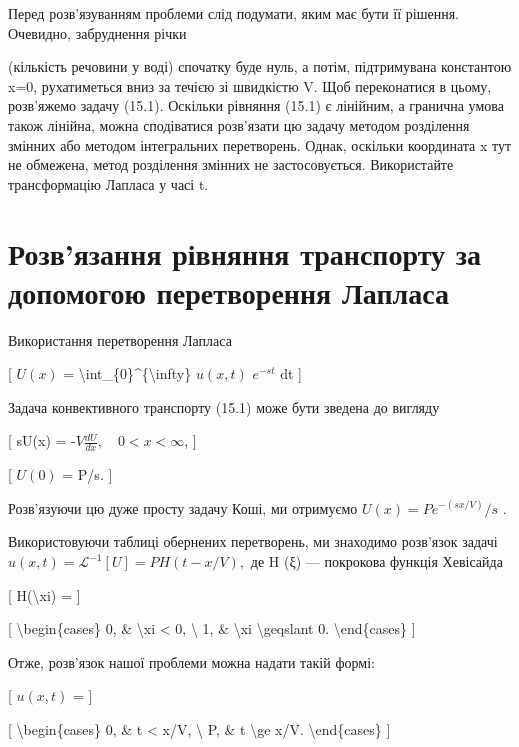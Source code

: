 \documentclass[
]{article}
\begin{document}
{{Перед розв'язуванням проблеми слід подумати, яким має бути її рішення.
Очевидно, забруднення річки

(кількість речовини у воді) спочатку буде нуль, а потім, підтримувана
константою x=0, рухатиметься вниз за течією зі швидкістю V. Щоб
переконатися в цьому, розв'яжемо задачу (15.1). Оскільки рівняння (15.1)
є лінійним, а гранична умова також лінійна, можна сподіватися розв'язати
цю задачу методом розділення змінних або методом інтегральних
перетворень. Однак, оскільки координата x тут не обмежена, метод
розділення змінних не застосовується. Використайте трансформацію Лапласа
у часі t.

\section{Розв'язання рівняння транспорту за допомогою перетворення
Лапласа}\label{ux440ux43eux437ux432ux44fux437ux430ux43dux43dux44f-ux440ux456ux432ux43dux44fux43dux43dux44f-ux442ux440ux430ux43dux441ux43fux43eux440ux442ux443-ux437ux430-ux434ux43eux43fux43eux43cux43eux433ux43eux44e-ux43fux435ux440ux435ux442ux432ux43eux440ux435ux43dux43dux44f-ux43bux430ux43fux43bux430ux441ux430}

Використання перетворення Лапласа

{[} \(U(x)\) = \textbackslash int\_\{0\}\^{}\{\textbackslash infty\}
\(u(x, t)\) \(e^{-st}\) dt {]}

Задача конвективного транспорту (15.1) може бути зведена до вигляду

{[} sU(x) = -\(V \frac{dU}{dx}, \quad 0 < x < \infty\), {]}

{[} \(U(0)\) = P/s. {]}

Розв'язуючи цю дуже просту задачу Коші, ми отримуємо
\(U(x) = Pe^{-(sx/V)}/s\) .

Використовуючи таблиці обернених перетворень, ми знаходимо розв'язок
задачі \(u(x, t) = \mathcal{L}^{-1}[U] = PH(t-x/V),\) де H (ξ) ---
покрокова функція Хевісайда

{[} H(\textbackslash xi) = {]}

{[} \textbackslash begin\{cases\} 0, \& \textbackslash xi \textless{} 0,
\textbackslash{} 1, \& \textbackslash xi \textbackslash geqslant 0.
\textbackslash end\{cases\} {]}

Отже, розв'язок нашої проблеми можна надати такій формі:

{[} \(u(x, t)\) = {]}

{[} \textbackslash begin\{cases\} 0, \& t \textless{} x/V,
\textbackslash{} P, \& t \textbackslash ge x/V.
\textbackslash end\{cases\} {]}

}}
\end{document}

